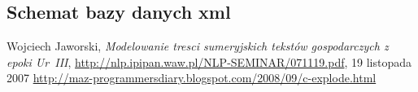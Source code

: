 \documentclass{pracamgr}
\begin{document}
\begin{appendix}
\appendixpage


\chapter{Schemat bazy danych xml}
\label{appendix:xmlsch}





\end{appendix}

\begin{thebibliography}{99}
 Wojciech Jaworski, \textit{Modelowanie tresci sumeryjskich tekstów gospodarczych z epoki Ur~III}, 
\url{http://nlp.ipipan.waw.pl/NLP-SEMINAR/071119.pdf}, 19 listopada 2007
 \url{http://maz-programmersdiary.blogspot.com/2008/09/c-explode.html}




\end{thebibliography}

\listoffigures
\end{document}
